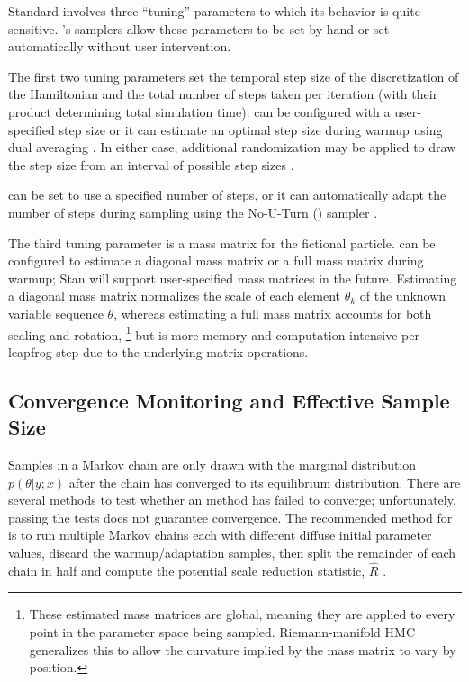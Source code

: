 Standard \HMC involves three ``tuning'' parameters to which its
behavior is quite sensitive.  \Stan's samplers allow these parameters
to be set by hand or set automatically without user intervention.

The first two tuning parameters set the temporal step size of the
discretization of the Hamiltonian and the total number of steps taken
per iteration (with their product determining total simulation time).
\Stan can be configured with a user-specified step size or it can
estimate an optimal step size during warmup using dual averaging
\citep{Nesterov:2009, Hoffman-Gelman:2011, Hoffman-Gelman:2014}.  
In either case, additional randomization may be applied to draw the 
step size from an interval of possible step sizes \citep{Neal:2011}.

\Stan can be set to use a specified number of steps, or it can
automatically adapt the number of steps during sampling using the
No-U-Turn (\NUTS) sampler 
\citep{Hoffman-Gelman:2011, Hoffman-Gelman:2014}.  

The third tuning parameter is a mass matrix for the fictional
particle.  \Stan can be configured to estimate a diagonal mass matrix
or a full mass matrix during warmup; Stan will support user-specified
mass matrices in the future.  Estimating a diagonal mass matrix
normalizes the scale of each element $\theta_k$ of the unknown
variable sequence $\theta$, whereas estimating a full mass matrix
accounts for both scaling and rotation,%
%
\footnote{These estimated mass matrices are global, meaning they are
  applied to every point in the parameter space being sampled.
  Riemann-manifold HMC generalizes this to allow the curvature implied
  by the mass matrix to vary by position.}
%
but is more memory and computation intensive per leapfrog step due to
the underlying matrix operations.

\subsection{Convergence Monitoring and Effective Sample Size}

Samples in a Markov chain are only drawn with the marginal
distribution $p(\theta|y;x)$ after the chain has converged to its
equilibrium distribution.  There are several methods to test whether
an \MCMC method has failed to converge; unfortunately, passing the
tests does not guarantee convergence.  The recommended method for
\Stan is to run multiple Markov chains each with different diffuse
initial parameter values, discard the warmup/adaptation samples, then
split the remainder of each chain in half and compute the potential
scale reduction statistic, $\hat{R}$ \citep{GelmanRubin:1992}.

